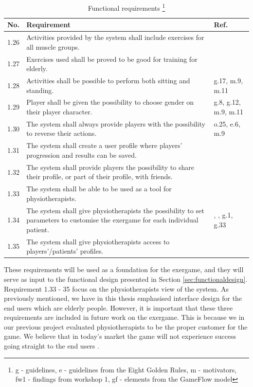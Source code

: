 \begin{minipage}{12 cm}
\begin{table} [H]
\centering
\begin{tabular}{|>{\raggedright}p{}|p{}|p{}|}
\hline
\textbf{No.} & \textbf{Requirement} & \textbf{Ref.} \\ \hline
1.26 & Activities provided by the system shall include exercises for all muscle groups. & \cite{guidelines} \\ \hline
1.27 & Exercises used shall be proved to be good for training for elderly. & \cite{project} \cite{john2012smartsenior}\\ \hline
1.28 & Activities shall be possible to perform both sitting and standing. & g.17, m.9, m.11 \\ \hline
1.29 & Player shall be given the possibility to choose gender on their player character. &  g.8, g.12, m.9, m.11 \\ \hline
1.30 & The system shall always provide players with the possibility to reverse their actions. & o.25, e.6, m.9 \\ \hline
1.31 & The system shall create a user profile where players' progression and results can be saved. & \cite{project} \cite{john2012smartsenior} \\ \hline
1.32 & The system shall provide players the possibility to share their profile, or part of their profile, with friends. &  \cite{sweetser} \\ \hline
1.33 & The system shall be able to be used as a tool for physiotherapists. & \cite{project} \cite{john2012smartsenior}\\ \hline
1.34 & The system shall give physiotherapists the possibility to set parameters to customise the exergame for each individual patient. & \cite{project}, \cite{john2012smartsenior}, g.1, g.33  \\ \hline
1.35 & The system shall give physiotherapists access to players'/patients' profiles. & \cite{project} \cite{john2012smartsenior}\\ \hline  
\end{tabular}
\caption[Functional requirements, part 3]{Functional requirements \footnote{g - guidelines, e - guidelines from the Eight Golden Rules, m - motivators, fw1 - findings from workshop 1, gf - elements from the GameFlow model}}
\label{tab:func3}
\end{table} 
\end{minipage}


These requirements will be used as a foundation for the exergame, and they will serve as input to the functional design presented in Section \ref{sec:functionaldesign}. Requirement 1.33 - 35 focus on the physiotherapists view of the system. As previously mentioned, we have in this thesis emphasised interface design for the end users which are elderly people. However, it is important that these three requirements are included in future work on the exergame. This is because we in our previous project \cite{project} evaluated physiotherapists to be the proper customer for the game. We believe that in today's market the game will not experience success going straight to the end users \cite{project}.  

